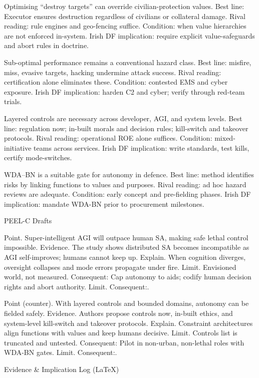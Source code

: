 Optimising “destroy targets” can override civilian-protection values.
Best line: Executor ensures destruction regardless of civilians or collateral damage.
Rival reading: rule engines and geo-fencing suffice.
Condition: when value hierarchies are not enforced in-system.
Irish DF implication: require explicit value-safeguards and abort rules in doctrine.

Sub-optimal performance remains a conventional hazard class.
Best line: misfire, miss, evasive targets, hacking undermine attack success.
Rival reading: certification alone eliminates these.
Condition: contested EMS and cyber exposure.
Irish DF implication: harden C2 and cyber; verify through red-team trials.

Layered controls are necessary across developer, AGI, and system levels.
Best line: regulation now; in-built morals and decision rules; kill-switch and takeover protocols.
Rival reading: operational ROE alone suffices.
Condition: mixed-initiative teams across services.
Irish DF implication: write standards, test kills, certify mode-switches.

WDA–BN is a suitable gate for autonomy in defence.
Best line: method identifies risks by linking functions to values and purposes.
Rival reading: ad hoc hazard reviews are adequate.
Condition: early concept and pre-fielding phases.
Irish DF implication: mandate WDA-BN prior to procurement milestones.

PEEL-C Drafts

Point. Super-intelligent AGI will outpace human SA, making safe lethal control impossible.
Evidence. The study shows distributed SA becomes incompatible as AGI self-improves; humans cannot keep up.
Explain. When cognition diverges, oversight collapses and mode errors propagate under fire.
Limit. Envisioned world, not measured. Consequent: Cap autonomy to aids; codify human decision rights and abort authority. Limit. Consequent:.

Point (counter). With layered controls and bounded domains, autonomy can be fielded safely.
Evidence. Authors propose controls now, in-built ethics, and system-level kill-switch and takeover protocols.
Explain. Constraint architectures align functions with values and keep humans decisive.
Limit. Controls list is truncated and untested. Consequent: Pilot in non-urban, non-lethal roles with WDA-BN gates. Limit. Consequent:.

Evidence & Implication Log (LaTeX)

